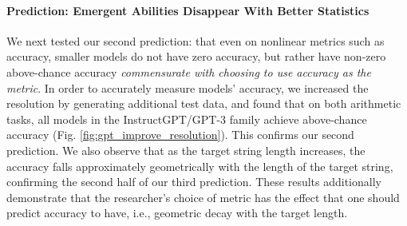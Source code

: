 \paragraph{Prediction: Emergent Abilities Disappear With Better Statistics}

We next tested our second prediction: that even on nonlinear metrics such as accuracy, smaller models do not have zero accuracy, but rather have non-zero above-chance accuracy \textit{commensurate with choosing to use accuracy as the metric}. In order to accurately measure models' accuracy, we increased the resolution by generating additional test data, and found that on both arithmetic tasks, all models in the InstructGPT/GPT-3 family achieve above-chance accuracy (Fig. \ref{fig:gpt_improve_resolution}). This confirms our second prediction. We also observe that as the target string length increases, the accuracy falls approximately geometrically with the length of the target string, confirming the second half of our third prediction. These results additionally demonstrate that the researcher's choice of metric has the effect that one should predict accuracy to have, i.e., geometric decay with the target length.




